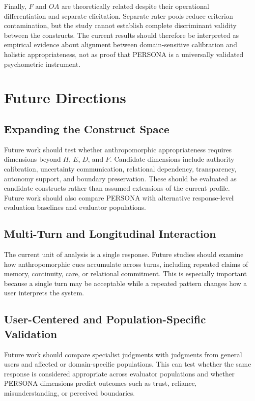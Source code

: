 \documentclass[manuscript,review,anonymous]{acmart}
\begin{document}
Finally, $F$ and $OA$ are theoretically related despite their operational differentiation and separate elicitation. Separate rater pools reduce criterion contamination, but the study cannot establish complete discriminant validity between the constructs. The current results should therefore be interpreted as empirical evidence about alignment between domain-sensitive calibration and holistic appropriateness, not as proof that PERSONA is a universally validated psychometric instrument.

\section{Future Directions}

\subsection{Expanding the Construct Space}

Future work should test whether anthropomorphic appropriateness requires dimensions beyond $H$, $E$, $D$, and $F$. Candidate dimensions include authority calibration, uncertainty communication, relational dependency, transparency, autonomy support, and boundary preservation. These should be evaluated as candidate constructs rather than assumed extensions of the current profile. Future work should also compare PERSONA with alternative response-level evaluation baselines and evaluator populations.

\subsection{Multi-Turn and Longitudinal Interaction}

The current unit of analysis is a single response. Future studies should examine how anthropomorphic cues accumulate across turns, including repeated claims of memory, continuity, care, or relational commitment. This is especially important because a single turn may be acceptable while a repeated pattern changes how a user interprets the system.

\subsection{User-Centered and Population-Specific Validation}

Future work should compare specialist judgments with judgments from general users and affected or domain-specific populations. This can test whether the same response is considered appropriate across evaluator populations and whether PERSONA dimensions predict outcomes such as trust, reliance, misunderstanding, or perceived boundaries.
\end{document}
